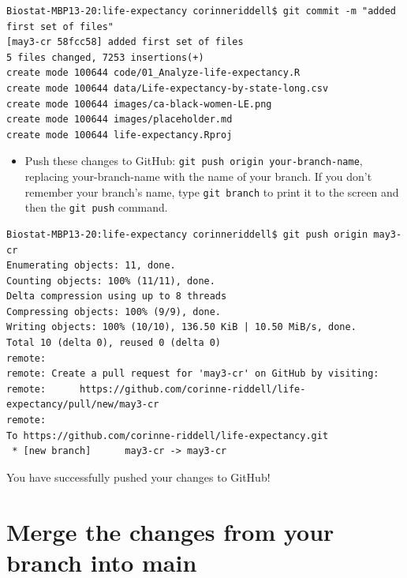 \documentclass[
]{book}
\providecommand{\tightlist}{%
  \setlength{\itemsep}{0pt}\setlength{\parskip}{0pt}}
\begin{document}
\begin{verbatim}
Biostat-MBP13-20:life-expectancy corinneriddell$ git commit -m "added first set of files"
[may3-cr 58fcc58] added first set of files
5 files changed, 7253 insertions(+)
create mode 100644 code/01_Analyze-life-expectancy.R
create mode 100644 data/Life-expectancy-by-state-long.csv
create mode 100644 images/ca-black-women-LE.png
create mode 100644 images/placeholder.md
create mode 100644 life-expectancy.Rproj
\end{verbatim}

\begin{itemize}
\tightlist
\item
  Push these changes to GitHub: \texttt{git\ push\ origin\ your-branch-name}, replacing
  your-branch-name with the name of your branch. If you don't remember your branch's
  name, type \texttt{git\ branch} to print it to the screen and then the \texttt{git\ push} command.
\end{itemize}

\begin{verbatim}
Biostat-MBP13-20:life-expectancy corinneriddell$ git push origin may3-cr
Enumerating objects: 11, done.
Counting objects: 100% (11/11), done.
Delta compression using up to 8 threads
Compressing objects: 100% (9/9), done.
Writing objects: 100% (10/10), 136.50 KiB | 10.50 MiB/s, done.
Total 10 (delta 0), reused 0 (delta 0)
remote: 
remote: Create a pull request for 'may3-cr' on GitHub by visiting:
remote:      https://github.com/corinne-riddell/life-expectancy/pull/new/may3-cr
remote: 
To https://github.com/corinne-riddell/life-expectancy.git
 * [new branch]      may3-cr -> may3-cr
\end{verbatim}

You have successfully pushed your changes to GitHub!

\hypertarget{merge-the-changes-from-your-branch-into-main}{%
\section{Merge the changes from your branch into main}\label{merge-the-changes-from-your-branch-into-main}}
\end{document}
